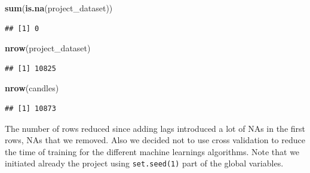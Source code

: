 \documentclass[
]{article}
\newenvironment{Shaded}{\begin{snugshade}}{\end{snugshade}}
\newcommand{\AttributeTok}[1]{\textcolor[rgb]{0.13,0.29,0.53}{#1}}
\newcommand{\ConstantTok}[1]{\textcolor[rgb]{0.56,0.35,0.01}{#1}}
\newcommand{\DecValTok}[1]{\textcolor[rgb]{0.00,0.00,0.81}{#1}}
\newcommand{\FloatTok}[1]{\textcolor[rgb]{0.00,0.00,0.81}{#1}}
\newcommand{\FunctionTok}[1]{\textcolor[rgb]{0.13,0.29,0.53}{\textbf{#1}}}
\newcommand{\NormalTok}[1]{#1}
\newcommand{\OtherTok}[1]{\textcolor[rgb]{0.56,0.35,0.01}{#1}}
\newcommand{\SpecialCharTok}[1]{\textcolor[rgb]{0.81,0.36,0.00}{\textbf{#1}}}
\begin{document}
\begin{Shaded}
\begin{Highlighting}[]
\FunctionTok{sum}\NormalTok{(}\FunctionTok{is.na}\NormalTok{(project\_dataset))}
\end{Highlighting}
\end{Shaded}

\begin{verbatim}
## [1] 0
\end{verbatim}

\begin{Shaded}
\begin{Highlighting}[]
\FunctionTok{nrow}\NormalTok{(project\_dataset)}
\end{Highlighting}
\end{Shaded}

\begin{verbatim}
## [1] 10825
\end{verbatim}

\begin{Shaded}
\begin{Highlighting}[]
\FunctionTok{nrow}\NormalTok{(candles)}
\end{Highlighting}
\end{Shaded}

\begin{verbatim}
## [1] 10873
\end{verbatim}

\begin{Shaded}
\end{Shaded}

The number of rows reduced since adding lags introduced a lot of NAs in
the first rows, NAs that we removed. Also we decided not to use cross
validation to reduce the time of training for the different machine
learnings algorithms. Note that we initiated already the project using
\texttt{set.seed(1)} part of the global variables.
\end{document}
